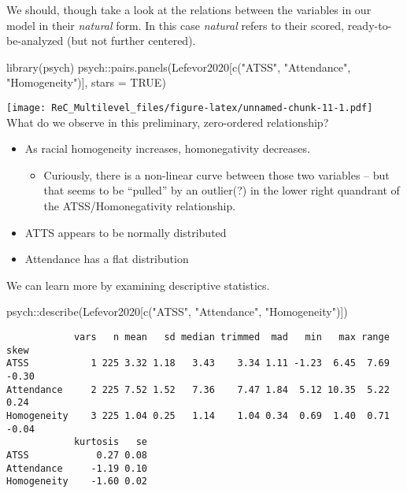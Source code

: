 \documentclass[
  11pt,
]{book}
\newenvironment{Shaded}{\begin{snugshade}}{\end{snugshade}}
\newcommand{\AttributeTok}[1]{\textcolor[rgb]{0.77,0.63,0.00}{#1}}
\newcommand{\ConstantTok}[1]{\textcolor[rgb]{0.00,0.00,0.00}{#1}}
\newcommand{\FunctionTok}[1]{\textcolor[rgb]{0.00,0.00,0.00}{#1}}
\newcommand{\NormalTok}[1]{#1}
\newcommand{\SpecialCharTok}[1]{\textcolor[rgb]{0.00,0.00,0.00}{#1}}
\newcommand{\StringTok}[1]{\textcolor[rgb]{0.31,0.60,0.02}{#1}}
\providecommand{\tightlist}{%
  \setlength{\itemsep}{0pt}\setlength{\parskip}{0pt}}
\begin{document}
We should, though take a look at the relations between the variables in our model in their \emph{natural} form. In this case \emph{natural} refers to their scored, ready-to-be-analyzed (but not further centered).

\begin{Shaded}
\begin{Highlighting}[]
\FunctionTok{library}\NormalTok{(psych)}
\NormalTok{psych}\SpecialCharTok{::}\FunctionTok{pairs.panels}\NormalTok{(Lefevor2020[}\FunctionTok{c}\NormalTok{(}\StringTok{"ATSS"}\NormalTok{, }\StringTok{"Attendance"}\NormalTok{, }\StringTok{"Homogeneity"}\NormalTok{)], }\AttributeTok{stars =} \ConstantTok{TRUE}\NormalTok{)}
\end{Highlighting}
\end{Shaded}

\texttt{[image: ReC\_Multilevel\_files/figure-latex/unnamed-chunk-11-1.pdf]}
What do we observe in this preliminary, zero-ordered relationship?

\begin{itemize}
\tightlist
\item
  As racial homogeneity increases, homonegativity decreases.

  \begin{itemize}
  \tightlist
  \item
    Curiously, there is a non-linear curve between those two variables -- but that seems to be ``pulled'' by an outlier(?) in the lower right quandrant of the ATSS/Homonegativity relationship.
  \end{itemize}
\item
  ATTS appears to be normally distributed
\item
  Attendance has a flat distribution
\end{itemize}

We can learn more by examining descriptive statistics.

\begin{Shaded}
\begin{Highlighting}[]
\NormalTok{psych}\SpecialCharTok{::}\FunctionTok{describe}\NormalTok{(Lefevor2020[}\FunctionTok{c}\NormalTok{(}\StringTok{"ATSS"}\NormalTok{, }\StringTok{"Attendance"}\NormalTok{, }\StringTok{"Homogeneity"}\NormalTok{)])}
\end{Highlighting}
\end{Shaded}

\begin{verbatim}
            vars   n mean   sd median trimmed  mad   min   max range  skew
ATSS           1 225 3.32 1.18   3.43    3.34 1.11 -1.23  6.45  7.69 -0.30
Attendance     2 225 7.52 1.52   7.36    7.47 1.84  5.12 10.35  5.22  0.24
Homogeneity    3 225 1.04 0.25   1.14    1.04 0.34  0.69  1.40  0.71 -0.04
            kurtosis   se
ATSS            0.27 0.08
Attendance     -1.19 0.10
Homogeneity    -1.60 0.02
\end{verbatim}
\end{document}

